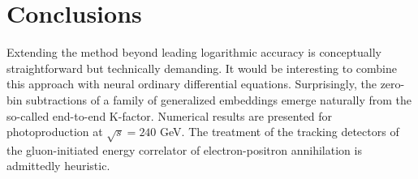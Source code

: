 \section{Conclusions}\label{sec:conclusions}

Extending the method beyond leading logarithmic accuracy is conceptually
straightforward but technically demanding. It would be interesting to
combine this approach with neural ordinary differential equations.
Surprisingly, the zero-bin subtractions of a family of generalized
embeddings emerge naturally from the so-called end-to-end K-factor.
Numerical results are presented for photoproduction at $\sqrt{s} = 240$
GeV. The treatment of the tracking detectors of the gluon-initiated
energy correlator of electron-positron annihilation is admittedly
heuristic.

